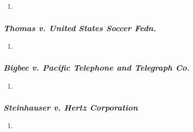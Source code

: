 \begin{enumerate}
    \item
\end{enumerate}

\subsubsection{\emph{Thomas v. United States Soccer Fedn.}}

\begin{enumerate}
    \item
\end{enumerate}

\subsubsection{\emph{Bigbee v. Pacific Telephone and Telegraph Co.}}

\begin{enumerate}
    \item
\end{enumerate}

\subsubsection{\emph{Steinhauser v. Hertz Corporation}}

\begin{enumerate}
    \item
\end{enumerate}
